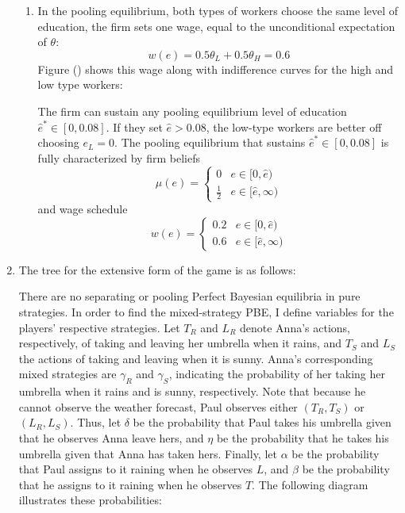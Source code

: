\documentclass[11pt]{article}
\begin{document}
\begin{enumerate}
\begin{enumerate}
		\item In the pooling equilibrium, both types of workers choose the same level of education, the firm sets one wage, equal to the unconditional expectation of $\theta$:
		\[w(e) = 0.5\theta_L + 0.5\theta_H = 0.6 \]
		Figure () shows this wage along with indifference curves for the high and low type workers:
		
		The firm can sustain any pooling equilibrium level of education $ \hat{e}^*\in[0, 0.08] $. If they set $ \hat{e} > 0.08 $, the low-type workers are better off choosing $ e_L = 0 $. The pooling equilibrium that sustains $ \hat{e}^*\in[0, 0.08] $ is fully characterized by firm beliefs
		\[\mu(e) = \begin{cases}
		0 & e\in[0, \hat{e}) \\ 
		\frac{1}{2} & e\in[\hat{e}, \infty)
		\end{cases}\]
		and wage schedule
		\[w(e) = \begin{cases}
		0.2 & e\in[0, \hat{e}) \\ 
		0.6 & e\in[\hat{e}, \infty)
		\end{cases}\]
	\end{enumerate}

	\item The tree for the extensive form of the game is as follows:
	
	There are no separating or pooling Perfect Bayesian equilibria in pure strategies. In order to find the mixed-strategy PBE, I define variables for the players' respective strategies. Let $ T_R $ and $ L_R $ denote Anna's actions, respectively, of taking and leaving her umbrella when it rains, and $ T_S $ and $ L_S $ the actions of taking and leaving when it is sunny. Anna's corresponding mixed strategies are $ \gamma_R $ and $\gamma_S$, indicating the probability of her taking her umbrella when it rains and is sunny, respectively. Note that because he cannot observe the weather forecast, Paul observes either $ (T_R, T_S) $ or $ (L_R, L_S) $. Thus, let $ \delta $ be the probability that Paul takes his umbrella given that he observes Anna leave hers, and $ \eta $ be the probability that he takes his umbrella given that Anna has taken hers. Finally, let $\alpha$ be the probability that Paul assigns to it raining when he observes $ L $, and $\beta$ be the probability that he assigns to it raining when he observes $ T $. The following diagram illustrates these probabilities:
	

\end{enumerate}
\end{document}
